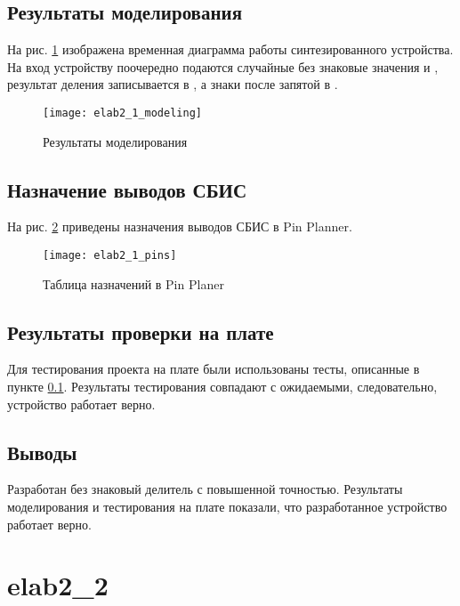 \subsection{Результаты моделирования}
\label{sec:elab2_1_modeling}

На рис. \ref{fig:elab2_1_modeling} изображена временная диаграмма работы синтезированного устройства. На вход устройству поочередно подаются случайные без знаковые значения  и , результат деления записывается в , а знаки после запятой в .
\begin{figure}[H]
\begin{center}
	\texttt{[image: elab2\_1\_modeling]}
	\caption{Результаты моделирования}
	\label{fig:elab2_1_modeling}
\end{center}
\end{figure}

\subsection{Назначение выводов СБИС}

На рис. \ref{fig:elab2_1_pins} приведены назначения выводов СБИС в Pin Planner.

\begin{figure}[H]
\begin{center}
	\texttt{[image: elab2\_1\_pins]}
	\caption{Таблица назначений в Pin Planer}
	\label{fig:elab2_1_pins}
\end{center}
\end{figure}

\subsection{Результаты проверки на плате}

Для тестирования проекта на плате были использованы тесты, описанные в пункте \ref{sec:elab2_1_modeling}. Результаты тестирования совпадают с ожидаемыми, следовательно, устройство работает верно.

\subsection{Выводы}

Разработан без знаковый делитель с повышенной точностью. Результаты моделирования и тестирования на плате показали, что разработанное устройство работает верно.

\section{elab2\_2}

